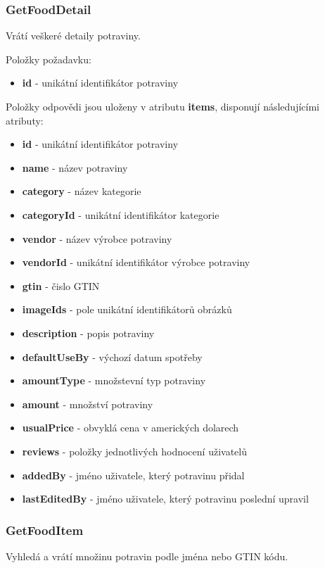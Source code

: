\documentclass[thesis=B,czech]{FITthesis}[2013/10/20]
\begin{document}
\subsubsection{GetFoodDetail}
Vrátí veškeré detaily potraviny.

Položky požadavku:
\begin{itemize}
  \item \textbf{id} - unikátní identifikátor potraviny
\end{itemize}

Položky odpovědi jsou uloženy v atributu \textbf{items}, disponují následujícími atributy:
\begin{itemize}
  \item \textbf{id} - unikátní identifikátor potraviny
  \item \textbf{name} - název potraviny
  \item \textbf{category} - název kategorie
  \item \textbf{categoryId} - unikátní identifikátor kategorie
  \item \textbf{vendor} - název výrobce potraviny
  \item \textbf{vendorId} - unikátní identifikátor výrobce potraviny
  \item \textbf{gtin} - čislo GTIN
  \item \textbf{imageIds} - pole unikátní identifikátorů obrázků
  \item \textbf{description} - popis potraviny
  \item \textbf{defaultUseBy} - výchozí datum spotřeby
  \item \textbf{amountType} - množstevní typ potraviny
  \item \textbf{amount} - množství potraviny
  \item \textbf{usualPrice} - obvyklá cena v amerických dolarech
  \item \textbf{reviews} - položky jednotlivých hodnocení uživatelů
  \item \textbf{addedBy} - jméno uživatele, který potravinu přidal
  \item \textbf{lastEditedBy} - jméno uživatele, který potravinu poslední upravil
\end{itemize}

\subsubsection{GetFoodItem}
Vyhledá a vrátí množinu potravin podle jména nebo GTIN kódu.
\end{document}
